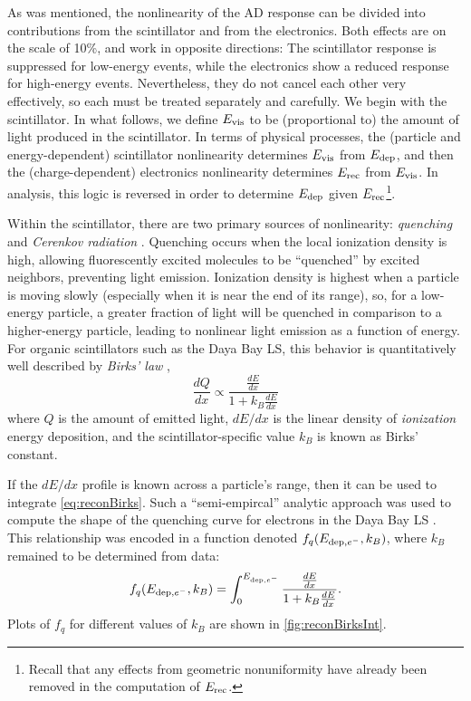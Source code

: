 \documentclass[../thesis.tex]{subfiles}
\begin{document}
As was mentioned, the nonlinearity of the AD response can be divided into contributions from the scintillator and from the electronics. Both effects are on the scale of 10\%, and work in opposite directions: The scintillator response is suppressed for low-energy events, while the electronics show a reduced response for high-energy events. Nevertheless, they do not cancel each other very effectively, so each must be treated separately and carefully. We begin with the scintillator. In what follows, we define $E_\mathrm{vis}$ to be (proportional to) the amount of light produced in the scintillator. In terms of physical processes, the (particle and energy-dependent) scintillator nonlinearity determines $E_\mathrm{vis}$ from $E_\mathrm{dep}$, and then the (charge-dependent) electronics nonlinearity determines $E_\mathrm{rec}$ from $E_\mathrm{vis}$. In analysis, this logic is reversed in order to determine $E_\mathrm{dep}$ given $E_\mathrm{rec}$\footnote{Recall that any effects from geometric nonuniformity have already been removed in the computation of $E_\mathrm{rec}$.}.

Within the scintillator, there are two primary sources of nonlinearity: \emph{quenching} \cite{Birks_1951} and \emph{Cerenkov radiation} \cite{cerenkov}. Quenching occurs when the local ionization density is high, allowing fluorescently excited molecules to be ``quenched'' by excited neighbors, preventing light emission. Ionization density is highest when a particle is moving slowly (especially when it is near the end of its range), so, for a low-energy particle, a greater fraction of light will be quenched in comparison to a higher-energy particle, leading to nonlinear light emission as a function of energy. For organic scintillators such as the Daya Bay LS, this behavior is quantitatively well described by \emph{Birks' law} \cite{Birks_1951},
\begin{equation}
  \frac{dQ}{dx} \propto \frac{\frac{dE}{dx}}{1 + k_B \frac{dE}{dx}}
  \label{eq:reconBirks}
\end{equation}
where $Q$ is the amount of emitted light, $dE/dx$ is the linear density of \emph{ionization} energy deposition, and the scintillator-specific value $k_B$ is known as Birks' constant.

If the $dE/dx$ profile is known across a particle's range, then it can be used to integrate \eqref{eq:reconBirks}. Such a ``semi-empircal'' analytic approach was used to compute the shape of the quenching curve for electrons in the Daya Bay LS \cite{NonlinearityPaper}. This relationship was encoded in a function denoted $f_q(E_{\mathrm{dep},e^-}, k_B)$, where $k_B$ remained to be determined from data:
\begin{equation}
  f_q(E_{\mathrm{dep},e^-},k_B) = \int_0^{E_{\mathrm{dep},e^-}} \frac{\frac{dE}{dx}}{1 + k_B \frac{dE}{dx}}.
  \label{eq:reconBirksInt}
\end{equation}
Plots of $f_q$ for different values of $k_B$ are shown in \autoref{fig:reconBirksInt}.
\end{document}
